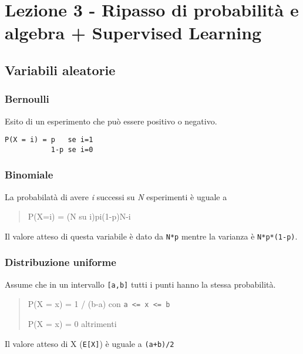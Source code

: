 \section{Lezione 3 - Ripasso di probabilità e algebra + Supervised
Learning}\label{lezione-3---ripasso-di-probabilituxe0-e-algebra-supervised-learning}

\subsection{Variabili aleatorie}\label{variabili-aleatorie}

\subsubsection{Bernoulli}\label{bernoulli}

Esito di un esperimento che può essere positivo o negativo.

\begin{verbatim}
P(X = i) = p   se i=1 
           1-p se i=0
\end{verbatim}

\subsubsection{Binomiale}\label{binomiale}

La probabilatà di avere \emph{i} successi su \emph{N} esperimenti è
uguale a

\begin{quote}
P(X=i) = (N su i)pi(1-p)N-i
\end{quote}

Il valore atteso di questa variabile è dato da \texttt{N*p} mentre la
varianza è \texttt{N*p*(1-p)}.

\subsubsection{Distribuzione uniforme}\label{distribuzione-uniforme}

Assume che in un intervallo \texttt{{[}a,b{]}} tutti i punti hanno la
stessa probabilità.

\begin{quote}
P(X = x) = 1 / (b-a) con \texttt{a\ \textless{}=\ x\ \textless{}=\ b}

P(X = x) = 0 altrimenti
\end{quote}

Il valore atteso di X (\texttt{E{[}X{]}}) è uguale a \texttt{(a+b)/2}

